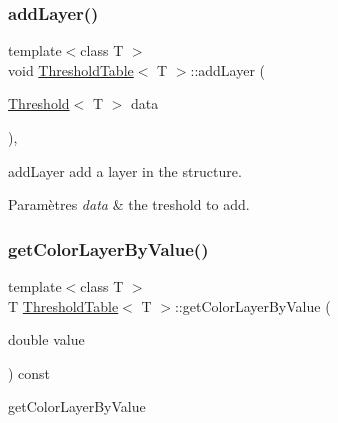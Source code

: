 \subsubsection{\texorpdfstring{add\+Layer()}{addLayer()}\hspace{0.1cm}{\footnotesize\ttfamily [2/2]}}
{\footnotesize\ttfamily template$<$class T $>$ \\
void \hyperlink{class_threshold_table}{Threshold\+Table}$<$ T $>$\+::add\+Layer (\begin{DoxyParamCaption}\item[{\hyperlink{struct_threshold}{Threshold}$<$ T $>$}]{data }\end{DoxyParamCaption})\hspace{0.3cm}{\ttfamily [inline]}, {\ttfamily [private]}}



add\+Layer add a layer in the structure. 


\begin{DoxyParams}{Paramètres}
{\em data} & the treshold to add. \\
\hline
\end{DoxyParams}
\mbox{\label{class_threshold_table_a35e7219d9476c3a5c0362e80ab7f5596}} 
\subsubsection{\texorpdfstring{get\+Color\+Layer\+By\+Value()}{getColorLayerByValue()}}
{\footnotesize\ttfamily template$<$class T $>$ \\
T \hyperlink{class_threshold_table}{Threshold\+Table}$<$ T $>$\+::get\+Color\+Layer\+By\+Value (\begin{DoxyParamCaption}\item[{double}]{value }\end{DoxyParamCaption}) const\hspace{0.3cm}{\ttfamily [inline]}}



get\+Color\+Layer\+By\+Value 


